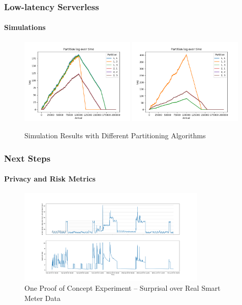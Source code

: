 \documentclass[aspectratio=169]{beamer}
\begin{document}
\begin{frame}
	\frametitle{Low-latency Serverless}
	\framesubtitle{Simulations}

	\begin{figure}[h]
		\centering
		\includegraphics[width=0.49\textwidth]{diffservices-lyapunov}
		\includegraphics[width=0.49\textwidth]{diffservices-optimal}
		\caption{Simulation Results with Different Partitioning Algorithms}
	\end{figure}
\end{frame}

\begin{frame}
	\frametitle{Next Steps}
	\framesubtitle{Privacy and Risk Metrics}

	\begin{figure}[h]
		\centering
		\includegraphics[width=0.8\textwidth]{surprisal}
		\caption{One Proof of Concept Experiment -- Surprisal over Real Smart Meter Data}
	\end{figure}
\end{frame}
\end{document}
